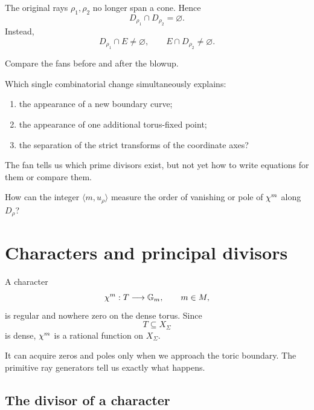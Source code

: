 The original rays \(\rho_1,\rho_2\) no longer span a cone. Hence
\[
D_{\rho_1}\cap D_{\rho_2}=\varnothing.
\]
Instead,
\[
D_{\rho_1}\cap E\neq\varnothing,
\qquad
E\cap D_{\rho_2}\neq\varnothing.
\]

\begin{pauseandthink}
Compare the fans before and after the blowup.

Which single combinatorial change simultaneously explains:
\begin{enumerate}[label=(\alph*),wide=0pt]
\item the appearance of a new boundary curve;
\item the appearance of one additional torus-fixed point;
\item the separation of the strict transforms of the coordinate axes?
\end{enumerate}
\end{pauseandthink}

The fan tells us which prime divisors exist, but not yet how to
write equations for them or compare them.

\begin{guidingquestion}
How can the integer \(\langle m,u_\rho\rangle\) measure the order of
vanishing or pole of \(\chi^{m}\) along \(D_\rho\)?
\end{guidingquestion}

\section{Characters and principal divisors}
\label{sec:characters-principal-divisors}

A character
\[
\chi^{m}:T\longrightarrow\mathbb{G}_{m},
\qquad
m\in M,
\]
is regular and nowhere zero on the dense torus. Since
\[
T\subseteq X_\Sigma
\]
is dense, \(\chi^{m}\) is a rational function on \(X_\Sigma\).

It can acquire zeros and poles only when we approach the toric
boundary. The primitive ray generators tell us exactly what happens.

\subsection{The divisor of a character}

